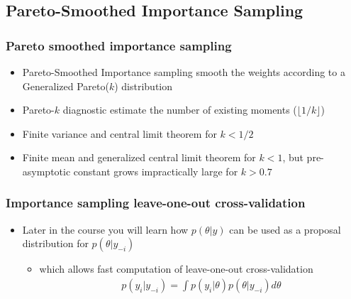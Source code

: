 \documentclass[10pt]{beamer}
\begin{document}
\subsection{Pareto-Smoothed Importance Sampling}


\begin{frame}

\frametitle{Pareto smoothed importance sampling}

  \begin{itemize}
  \item Pareto-Smoothed Importance sampling smooth the weights according to a Generalized Pareto($k$) distribution
  \item Pareto-$k$ diagnostic estimate the number of existing moments ($\lfloor 1/k \rfloor$)
  \item<2-> Finite variance and central limit theorem for $k<1/2$
  \item<3-> Finite mean and generalized central limit theorem for $k<1$,
    but pre-asymptotic constant grows impractically large for $k>0.7$
  \end{itemize}
\end{frame}

\begin{frame}

\frametitle{Importance sampling leave-one-out cross-validation}

  \begin{itemize}
  \item Later in the course you will learn how $p(\theta|y)$ can be
    used as a proposal distribution for $p(\theta|y_{-i})$
    \begin{itemize}
    \item which allows fast computation of leave-one-out cross-validation
      \begin{align*}
        p(y_i|y_{-i})=\int p(y_i|\theta) p(\theta|y_{-i}) d\theta
      \end{align*}
    \end{itemize}
  \end{itemize}

\end{frame}

%
%
%
\end{document}
